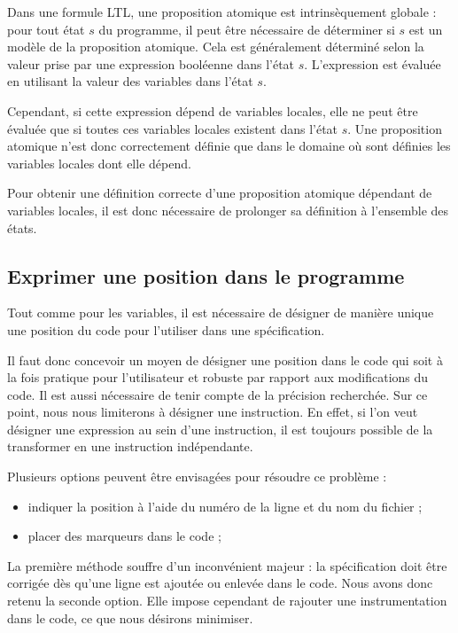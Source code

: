 Dans une formule LTL, une proposition atomique est intrinsèquement globale :
pour tout état \(s\) du programme, il peut être nécessaire de déterminer si
\(s\) est un modèle de la proposition atomique. Cela est généralement déterminé
selon la valeur prise par une expression booléenne dans l'état \(s\).
L'expression est évaluée en utilisant la valeur des variables dans l'état \(s\).

Cependant, si cette expression dépend de variables locales, elle ne peut être
évaluée que si toutes ces variables locales existent dans l'état \(s\). Une
proposition atomique n'est donc correctement définie que dans le domaine où sont
définies les variables locales dont elle dépend.

Pour obtenir une définition correcte d'une proposition atomique dépendant de
variables locales, il est donc nécessaire de prolonger sa définition à
l'ensemble des états.

\subsection{Exprimer une position dans le programme}

Tout comme pour les variables, il est nécessaire de désigner de manière unique
une position du code pour l'utiliser dans une spécification.

Il faut donc concevoir un moyen de désigner une position dans le code qui soit
à la fois pratique pour l'utilisateur et robuste par rapport aux modifications du
code.
Il est aussi nécessaire de tenir compte de la précision recherchée. Sur ce
point, nous nous limiterons à désigner une instruction. En effet, si l'on veut
désigner une expression au sein d'une instruction, il est toujours possible de
la transformer en une instruction indépendante.

Plusieurs options peuvent être envisagées pour résoudre ce problème :

\begin{itemize}
\item
  indiquer la position à l'aide du numéro de la ligne et du nom du fichier ;
\item
  placer des marqueurs dans le code ;
\end{itemize}

La première méthode souffre d'un inconvénient majeur : la spécification doit
être corrigée dès qu'une ligne est ajoutée ou enlevée dans le code. Nous avons
donc retenu la seconde option. Elle impose cependant de rajouter une
instrumentation dans le code, ce que nous désirons minimiser.

